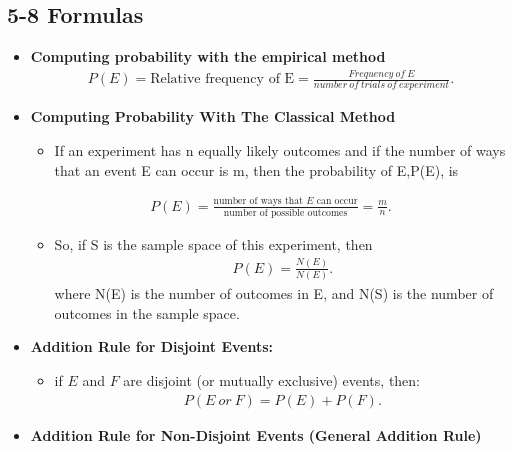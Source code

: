 \documentclass{report}
\begin{document}
    \pagebreak 
    \subsection*{5-8 Formulas}
    \bigbreak \noindent 
        \begin{itemize}
        \item \textbf{Computing probability with the empirical method}
        \begin{align*}
            P(E) = \text{Relative frequency of E} = \frac{Frequency\ of\ E}{number\ of\ trials\ of\ experiment}
        .\end{align*}
      \item \textbf{Computing Probability With The Classical Method}
            \begin{itemize}
                \item If an experiment has n equally likely outcomes and if the number of ways that an event E can occur is m, then the probability of E,P(E), is
            \end{itemize}
            \begin{align*}
                P(E) = \frac{\text{number of ways that $E$ can occur}}{\text{number of possible outcomes}} = \frac{m}{n}
            .\end{align*}
            \begin{itemize}
                \item So, if S is the sample space of this experiment, then
                    \begin{align*}
                        P(E) = \frac{N(E)}{N(E)}
                    .\end{align*}
            where N(E) is the number of outcomes in E, and N(S) is the number of outcomes in the sample space.
            \end{itemize}
                    \item \textbf{Addition Rule for Disjoint Events:}
            \begin{itemize}
                \item if $E $ and $F $ are disjoint (or mutually exclusive) events, then:
                    \begin{align*}
                        P(E\ or\ F) = P(E) + P(F)
                    .\end{align*}
            \end{itemize}
        \item \textbf{Addition Rule for Non-Disjoint Events (General Addition Rule)}

\end{itemize}
\end{document}
